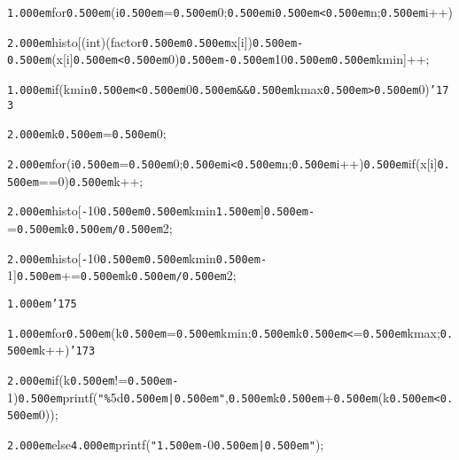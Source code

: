 \documentclass[uplatex,a4paper]{jsarticle}
\begin{document}
\noindent
{\tt\mc \kern1.000em}for{\tt\mc \kern0.500em}(i{\tt\mc \kern0.500em}={\tt\mc \kern0.500em}0;{\tt\mc \kern0.500em}i{\tt\mc \kern0.500em}{\tt <}{\tt\mc \kern0.500em}n;{\tt\mc \kern0.500em}i++)

\noindent
{\tt\mc \kern2.000em}histo[(int)(factor{\tt\mc \kern0.500em}{\tt *}{\tt\mc \kern0.500em}x[i]){\tt\mc \kern0.500em}{\tt -}{\tt\mc \kern0.500em}(x[i]{\tt\mc \kern0.500em}{\tt <}{\tt\mc \kern0.500em}0){\tt\mc \kern0.500em}{\tt -}{\tt\mc \kern0.500em}10{\tt\mc \kern0.500em}{\tt *}{\tt\mc \kern0.500em}kmin]++;

\noindent
{\tt\mc \kern1.000em}if(kmin{\tt\mc \kern0.500em}{\tt <}{\tt\mc \kern0.500em}0{\tt\mc \kern0.500em}{\tt\&}{\tt\&}{\tt\mc \kern0.500em}kmax{\tt\mc \kern0.500em}{\tt >}{\tt\mc \kern0.500em}0){\tt\char'173}

\noindent
{\tt\mc \kern2.000em}k{\tt\mc \kern0.500em}={\tt\mc \kern0.500em}0;

\noindent
{\tt\mc \kern2.000em}for(i{\tt\mc \kern0.500em}={\tt\mc \kern0.500em}0;{\tt\mc \kern0.500em}i{\tt <}{\tt\mc \kern0.500em}n;{\tt\mc \kern0.500em}i++){\tt\mc \kern0.500em}if(x[i]{\tt\mc \kern0.500em}==0){\tt\mc \kern0.500em}k++;

\noindent
{\tt\mc \kern2.000em}histo[{\tt -}10{\tt\mc \kern0.500em}{\tt *}{\tt\mc \kern0.500em}kmin{\tt\mc \kern1.500em}]{\tt\mc \kern0.500em}{\tt -}={\tt\mc \kern0.500em}k{\tt\mc \kern0.500em}{\tt /}{\tt\mc \kern0.500em}2;

\noindent
{\tt\mc \kern2.000em}histo[{\tt -}10{\tt\mc \kern0.500em}{\tt *}{\tt\mc \kern0.500em}kmin{\tt\mc \kern0.500em}{\tt -}1]{\tt\mc \kern0.500em}+={\tt\mc \kern0.500em}k{\tt\mc \kern0.500em}{\tt /}{\tt\mc \kern0.500em}2;

\noindent
{\tt\mc \kern1.000em}{\tt\char'175}

\noindent
{\tt\mc \kern1.000em}for{\tt\mc \kern0.500em}(k{\tt\mc \kern0.500em}={\tt\mc \kern0.500em}kmin;{\tt\mc \kern0.500em}k{\tt\mc \kern0.500em}{\tt <}={\tt\mc \kern0.500em}kmax;{\tt\mc \kern0.500em}k++){\tt\char'173}

\noindent
{\tt\mc \kern2.000em}if(k{\tt\mc \kern0.500em}!={\tt\mc \kern0.500em}{\tt -}1){\tt\mc \kern0.500em}printf({\tt "}{\tt\%}5d{\tt\mc \kern0.500em}{\tt |}{\tt\mc \kern0.500em}{\tt "},{\tt\mc \kern0.500em}k{\tt\mc \kern0.500em}+{\tt\mc \kern0.500em}(k{\tt\mc \kern0.500em}{\tt <}{\tt\mc \kern0.500em}0));

\noindent
{\tt\mc \kern2.000em}else{\tt\mc \kern4.000em}printf({\tt "}{\tt\mc \kern1.500em}{\tt -}0{\tt\mc \kern0.500em}{\tt |}{\tt\mc \kern0.500em}{\tt "});
\end{document}
